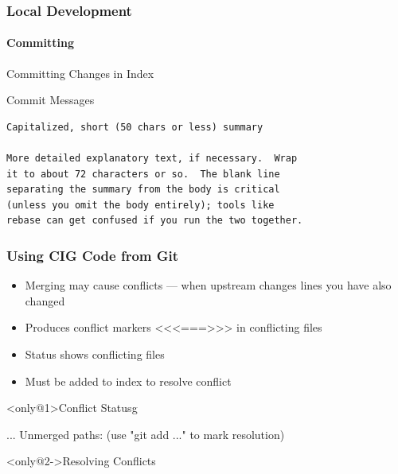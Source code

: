 \begin{frame}[fragile]
 \frametitle{Local Development}
 \framesubtitle{Committing}

 \begin{exampleblock}{Committing Changes in Index}
  \begin{semiverbatim}
\end{semiverbatim}
 \end{exampleblock}

 \begin{block}{Commit Messages}
\begin{verbatim}
Capitalized, short (50 chars or less) summary

More detailed explanatory text, if necessary.  Wrap
it to about 72 characters or so.  The blank line
separating the summary from the body is critical
(unless you omit the body entirely); tools like
rebase can get confused if you run the two together.
\end{verbatim}
 \end{block}
\end{frame}

\begin{frame}[fragile,t]
 \frametitle{Using CIG Code from Git}

 \begin{itemize}
  \item Merging may cause \alert{conflicts} --- when upstream changes lines you
        have also changed
  \item Produces conflict markers \alert{<{}<{}<===>{}>{}>} in conflicting files
  \item Status shows conflicting files
  \item Must be added to index to resolve conflict
 \end{itemize}

 \begin{minipage}[t][0.5\textheight][t]{0.97\textwidth}
  \begin{exampleblock}<only@1>{Conflict Status\textcolor{solarizedRebase02}{g}}
   \begin{semiverbatim}
...
 Unmerged paths:
    (use "git add ..." to mark resolution)

\end{semiverbatim}
  \end{exampleblock}

  \begin{exampleblock}<only@2->{Resolving Conflicts}
   \begin{semiverbatim}

\end{semiverbatim}
  \end{exampleblock}
 \end{minipage}
\end{frame}

